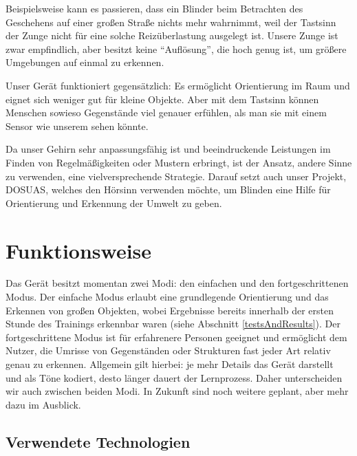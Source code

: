 \documentclass[a4paper,12pt,ngerman]{scrartcl}
\begin{document}
Beispielsweise kann es passieren, dass ein Blinder beim Betrachten des Geschehens auf 
einer großen Straße nichts mehr wahrnimmt, weil der Tastsinn der Zunge
nicht für eine solche Reizüberlastung ausgelegt ist. Unsere Zunge ist zwar empfindlich, aber besitzt keine
\enquote{Auflösung}, die hoch genug ist, um größere Umgebungen auf einmal zu erkennen.\par 
Unser Gerät funktioniert gegensätzlich: Es ermöglicht 
Orientierung im Raum und eignet sich weniger gut für kleine Objekte. Aber mit dem Tastsinn können Menschen
sowieso Gegenstände viel genauer erfühlen, als man sie mit einem Sensor wie unserem sehen könnte.\par
Da unser Gehirn sehr anpassungsfähig ist und beeindruckende
Leistungen im Finden von Regelmäßigkeiten oder Mustern erbringt, ist der Ansatz,
andere Sinne zu verwenden, eine vielversprechende Strategie. Darauf setzt auch 
unser Projekt, DOSUAS, welches den Hörsinn verwenden möchte, um Blinden eine Hilfe
für Orientierung und Erkennung der Umwelt zu geben.

\newpage

\section{Funktionsweise}

Das Gerät besitzt momentan zwei Modi: den einfachen und den fortgeschrittenen Modus. Der einfache Modus
erlaubt eine grundlegende Orientierung und das Erkennen von großen Objekten, wobei Ergebnisse bereits
innerhalb der ersten Stunde des Trainings erkennbar waren (siehe Abschnitt \ref{testsAndResults}). Der
fortgeschrittene Modus ist für erfahrenere Personen geeignet und ermöglicht dem Nutzer, die Umrisse von
Gegenständen oder Strukturen fast jeder Art relativ genau zu erkennen. Allgemein gilt hierbei:
je mehr Details das Gerät darstellt und als Töne kodiert, desto länger dauert der Lernprozess. 
Daher unterscheiden wir auch zwischen beiden Modi. In Zukunft sind noch weitere geplant, aber mehr dazu im 
Ausblick.

\subsection{Verwendete Technologien}
\end{document}
